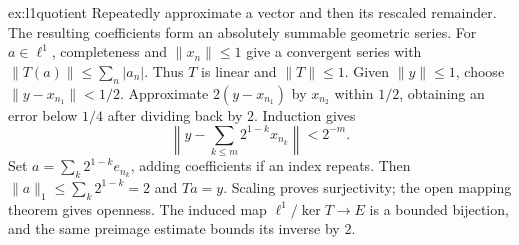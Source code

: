 \begin{solution}{ex:l1quotient}
\idea Repeatedly approximate a vector and then its rescaled remainder. The resulting coefficients form an absolutely summable geometric series.
\writeup For $a\in\ell^1$, completeness and $\|x_n\|\le1$ give a convergent series with $\|T(a)\|\le\sum_n|a_n|$. Thus $T$ is linear and $\|T\|\le1$. Given $\|y\|\le1$, choose $\|y-x_{n_1}\|<1/2$. Approximate $2(y-x_{n_1})$ by $x_{n_2}$ within $1/2$, obtaining an error below $1/4$ after dividing back by $2$. Induction gives
\[\left\|y-\sum_{k\le m}2^{1-k}x_{n_k}\right\|<2^{-m}.\]
Set $a=\sum_k2^{1-k}e_{n_k}$, adding coefficients if an index repeats. Then $\|a\|_1\le\sum_k2^{1-k}=2$ and $Ta=y$. Scaling proves surjectivity; the open mapping theorem gives openness. The induced map $\ell^1/\ker T\to E$ is a bounded bijection, and the same preimage estimate bounds its inverse by $2$.
\end{solution}

